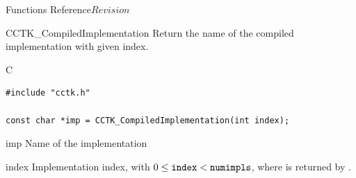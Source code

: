 \begin{cactuspart}{ Functions Reference}{}{$Revision$}
\begin{FunctionDescription}{CCTK\_CompiledImplementation}
\label{CCTK-CompiledImplementation}
Return the name of the compiled implementation with given index.

\begin{SynopsisSection}
\begin{Synopsis}{C}
\begin{verbatim}
#include "cctk.h"

const char *imp = CCTK_CompiledImplementation(int index);
\end{verbatim}
\end{Synopsis}
\end{SynopsisSection}

\begin{ResultSection}
\begin{Result}{imp}
Name of the implementation
\end{Result}
\end{ResultSection}

\begin{ParameterSection}
\begin{Parameter}{index}
Implementation index, with $0 \le \mbox{\texttt{index}} < \mbox{\texttt{numimpls}}$,
where  is returned by
.
\end{Parameter}
\end{ParameterSection}


\end{FunctionDescription}
\end{cactuspart}
